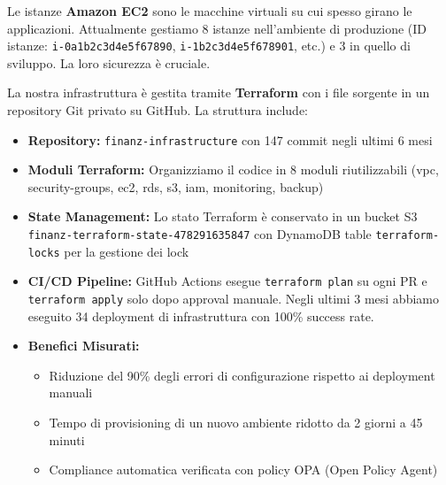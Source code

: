 Le istanze \textbf{Amazon EC2} sono le macchine virtuali su cui spesso girano le applicazioni. Attualmente gestiamo 8 istanze nell'ambiente di produzione (ID istanze: \texttt{i-0a1b2c3d4e5f67890}, \texttt{i-1b2c3d4e5f678901}, etc.) e 3 in quello di sviluppo. La loro sicurezza è cruciale.

La nostra infrastruttura è gestita tramite \textbf{Terraform} con i file sorgente in un repository Git privato su GitHub. La struttura include:
\begin{itemize}
    \item \textbf{Repository:} \texttt{finanz-infrastructure} con 147 commit negli ultimi 6 mesi
    \item \textbf{Moduli Terraform:} Organizziamo il codice in 8 moduli riutilizzabili (vpc, security-groups, ec2, rds, s3, iam, monitoring, backup)
    \item \textbf{State Management:} Lo stato Terraform è conservato in un bucket S3 \texttt{finanz-terraform-state-478291635847} con DynamoDB table \texttt{terraform-locks} per la gestione dei lock
    \item \textbf{CI/CD Pipeline:} GitHub Actions esegue \texttt{terraform plan} su ogni PR e \texttt{terraform apply} solo dopo approval manuale. Negli ultimi 3 mesi abbiamo eseguito 34 deployment di infrastruttura con 100\% success rate.
    \item \textbf{Benefici Misurati:}
        \begin{itemize}
            \item Riduzione del 90\% degli errori di configurazione rispetto ai deployment manuali
            \item Tempo di provisioning di un nuovo ambiente ridotto da 2 giorni a 45 minuti
            \item Compliance automatica verificata con policy OPA (Open Policy Agent)
        \end{itemize}
\end{itemize}